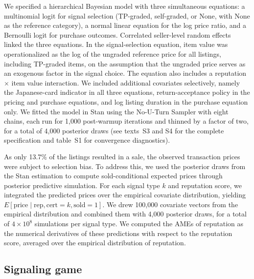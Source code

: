 \documentclass[11pt,letterpaper]{article}
\theoremstyle{definition}
\begin{document}
We specified a hierarchical Bayesian model with three simultaneous equations: a multinomial logit for signal selection (TP-graded, self-graded, or None, with None as the reference category), a normal linear equation for the log price ratio, and a Bernoulli logit for purchase outcomes. Correlated seller-level random effects linked the three equations. In the signal-selection equation, item value was operationalized as the log of the ungraded reference price for all listings, including TP-graded items, on the assumption that the ungraded price serves as an exogenous factor in the signal choice. The equation also includes a reputation $\times$ item value interaction. We included additional covariates selectively, namely the Japanese-card indicator in all three equations, return-acceptance policy in the pricing and purchase equations, and log listing duration in the purchase equation only. We fitted the model in Stan using the No-U-Turn Sampler with eight chains, each run for 1,000 post-warmup iterations and thinned by a factor of two, for a total of 4,000 posterior draws (see texts~S3 and S4 for the complete specification and table~S1 for convergence diagnostics).

As only 13.7\% of the listings resulted in a sale, the observed transaction prices were subject to selection bias. To address this, we used the posterior draws from the Stan estimation to compute sold-conditional expected prices through posterior predictive simulation. For each signal type $k$ and reputation score, we integrated the predicted prices over the empirical covariate distribution, yielding $E[\text{price} \mid \text{rep}, \text{cert} = k, \text{sold} = 1]$. We drew 100,000 covariate vectors from the empirical distribution and combined them with 4,000 posterior draws, for a total of $4 \times 10^{8}$ simulations per signal type. We computed the AMEs of reputation as the numerical derivatives of these predictions with respect to the reputation score, averaged over the empirical distribution of reputation.

\subsection*{Signaling game}
\end{document}

